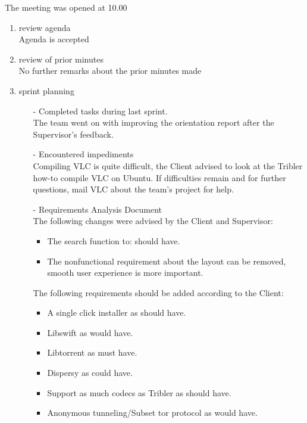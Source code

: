 \documentclass[pdftex, 12pt, a4paper]{report}
\begin{document}
\pagestyle{fancy}

The meeting was opened at 10.00

\begin{enumerate}
\item review agenda	\\
Agenda is accepted

\item review of prior minutes\\
No further remarks about the prior minutes made

\item sprint planning

\begin{enumerate}
\item[-] Completed tasks during last sprint.\\
The team went on with improving the orientation report after the Supervisor's feedback.

\item[-] Encountered impediments\\
Compiling VLC is quite difficult, the Client advised to look at the Tribler how-to compile VLC on Ubuntu. If difficulties remain and for further questions, mail VLC about the team's project for help.\\

\item[-] Requirements Analysis Document\\
The following changes were advised by the Client and Supervisor:

\begin{itemize}
	\item The search function to: should have.\\
	\item The nonfunctional requirement about the layout can be removed, smooth user experience is more important.\\
\end{itemize}

The following requirements should be added according to the Client:

\begin{itemize}
	\item A single click installer as should have.\\
	\item Libswift as would have.\\
	\item Libtorrent as must have.\\
	\item Dispersy as could have.\\
	\item Support as much codecs as Tribler as should have.\\
	\item Anonymous tunneling/Subset tor protocol as would have.\\
\end{itemize}


\end{enumerate}
\end{enumerate}
\end{document}
